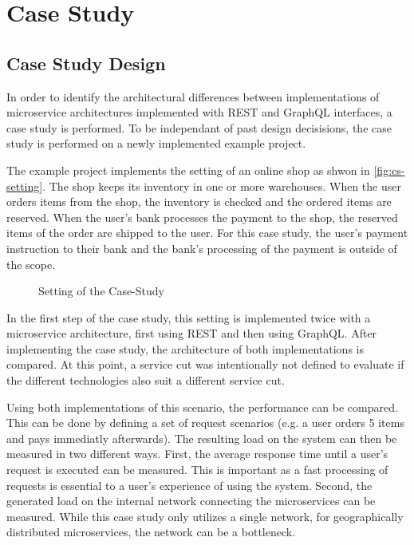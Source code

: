 \section{Case Study}\label{sec:case-study}

\subsection{Case Study Design}

In order to identify the architectural differences between implementations of microservice architectures implemented with REST and GraphQL interfaces, a case study is performed.
To be independant of past design decisisions, the case study is performed on a newly implemented example project.

The example project implements the setting of an online shop as shwon in \autoref{fig:cs-setting}.
The shop keeps its inventory in one or more warehouses.
When the user orders items from the shop, the inventory is checked and the ordered items are reserved.
When the user's bank processes the payment to the shop, the reserved items of the order are shipped to the user.
For this case study, the user's payment instruction to their bank and the bank's processing of the payment is outside of the scope.

\begin{figure}[!htb]
    \centering
    
    \caption{Setting of the Case-Study}
    \label{fig:cs-setting}
\end{figure}

In the first step of the case study, this setting is implemented twice with a microservice architecture, first using \ac{REST} and then using GraphQL.
After implementing the case study, the architecture of both implementations is compared.
At this point, a service cut was intentionally not defined to evaluate if the different technologies also suit a different service cut.

Using both implementations of this scenario, the performance can be compared.
This can be done by defining a set of request scenarios (e.g. a user orders 5 items and pays immediatly afterwards).
The resulting load on the system can then be measured in two different ways.
First, the average response time until a user's request is executed can be measured.
This is important as a fast processing of requests is essential to a user's experience of using the system.
Second, the generated load on the internal network connecting the microservices can be measured.
While this case study only utilizes a single network, for geographically distributed microservices, the network can be a bottleneck.

